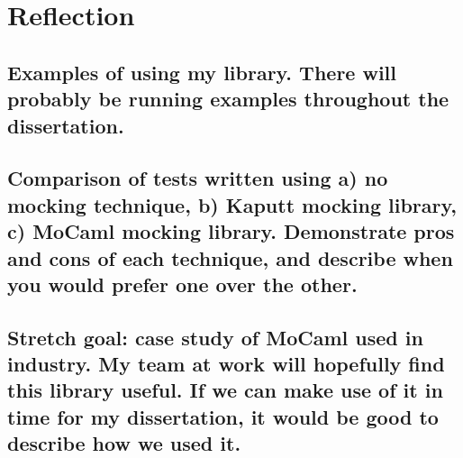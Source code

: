 \documentclass[11pt]{article}
\begin{document}
\section{Reflection}
\label{sec-4}
\subsection{Examples of using my library. There will probably be running examples throughout the dissertation.}
\label{sec-4-1}
\subsection{Comparison of tests written using a) no mocking technique, b) Kaputt mocking library, c) MoCaml mocking library. Demonstrate pros and cons of each technique, and describe when you would prefer one over the other.}
\label{sec-4-2}
\subsection{Stretch goal: case study of MoCaml used in industry. My team at work will hopefully find this library useful. If we can make use of it in time for my dissertation, it would be good to describe how we used it.}
\label{sec-4-3}
\end{document}
